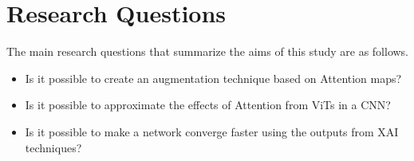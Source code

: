 \section{Research Questions} \label{section:researchq}
The main research questions that summarize the aims of this study are as follows.
\begin{itemize}
    \item Is it possible to create an augmentation technique based on Attention maps?
    \item Is it possible to approximate the effects of Attention from ViTs in a CNN?
    \item Is it possible to make a network converge faster using the outputs from XAI techniques?
\end{itemize}